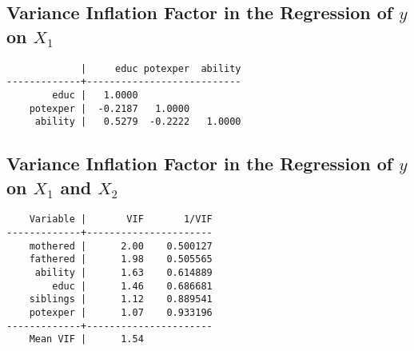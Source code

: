 \documentclass{article}
\begin{document}
\hypertarget{vif}{\subsection*{Variance Inflation Factor in the Regression of $y$ on $X_1$}}
\begin{verbatim}
             |     educ potexper  ability
-------------+---------------------------
        educ |   1.0000
    potexper |  -0.2187   1.0000
     ability |   0.5279  -0.2222   1.0000

\end{verbatim}

\subsection*{Variance Inflation Factor in the Regression of $y$ on $X_1$ and $X_2$}

\begin{verbatim}
    Variable |       VIF       1/VIF  
-------------+----------------------
    mothered |      2.00    0.500127
    fathered |      1.98    0.505565
     ability |      1.63    0.614889
        educ |      1.46    0.686681
    siblings |      1.12    0.889541
    potexper |      1.07    0.933196
-------------+----------------------
    Mean VIF |      1.54	
\end{verbatim}
\end{document}
